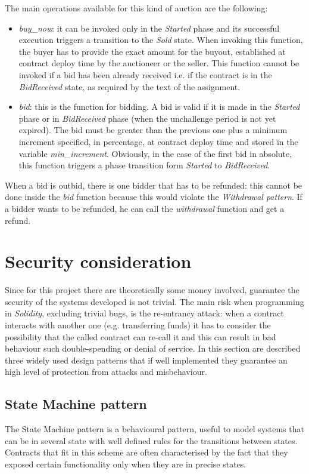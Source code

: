 \documentclass{article}
\begin{document}
The main operations available for this kind of auction are the following:
\begin{itemize}
    \item \textit{buy\_now}: it can be invoked only in the \textit{Started} phase and its successful execution triggers a transition to the \textit{Sold} state. When invoking this function, the buyer has to provide the exact amount for the buyout, established at contract deploy time by the auctioneer or the seller. This function cannot be invoked if a bid has been already received i.e. if the contract is in the \textit{BidReceived} state, as required by the text of the assignment.
    \item \textit{bid}: this is the function for bidding. A bid is valid if it is made in the \textit{Started} phase or in \textit{BidReceived} phase (when the unchallenge period is not yet expired). The bid must be greater than the previous one plus a minimum increment specified, in percentage, at contract deploy time and stored in the variable \textit{min\_increment}. Obviously, in the case of the first bid in absolute, this function triggers a phase transition form \textit{Started} to \textit{BidReceived}.
\end{itemize}

When a bid is outbid, there is one bidder that has to be refunded: this cannot be done inside the \textit{bid} function because this would violate the \textit{Withdrawal pattern}. If a bidder wants to be refunded, he can call the \textit{withdrawal} function and get a refund.

\section{Security consideration}

Since for this project there are theoretically some money involved, guarantee the security of the systems developed is not trivial. The main risk when programming in \textit{Solidity}, excluding trivial bugs, is the re-entrancy attack: when a contract interacts with another one (e.g. transferring funds) it has to consider the possibility that the called contract can re-call it and this can result in bad behaviour such double-spending or denial of service.
In this section are described three widely used design patterns that if well implemented they guarantee an high level of protection from attacks and misbehaviour. 
\subsection{State Machine pattern}\label{statemachine}
The State Machine pattern is a behavioural pattern, useful to model systems that can be in several state with well defined rules for the transitions between states.
Contracts that fit in this scheme are often characterised by the fact that they exposed certain functionality only when they are in precise states.
\end{document}
